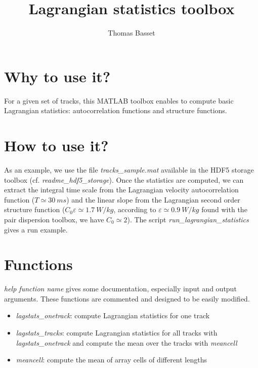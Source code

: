 \documentclass{article}
\title{Lagrangian statistics toolbox}
\author{Thomas Basset}
\begin{document}
\maketitle

\section{Why to use it?}
For a given set of tracks, this MATLAB toolbox enables to compute basic Lagrangian statistics: autocorrelation functions and structure functions. 

\section{How to use it?}
As an example, we use the file \textit{tracks\_sample.mat} available in the HDF5 storage toolbox (cf. \textit{readme\_hdf5\_storage}). Once the statistics are computed, we can extract the integral time scale from the Lagrangian velocity autocorrelation function ($T \simeq \SI{30}{ms}$) and the linear slope from the Lagrangian second order structure function ($C_0 \varepsilon \simeq \SI{1.7}{W/kg}$, according to $\varepsilon \simeq \SI{0.9}{W/kg}$ found with the pair dispersion toolbox, we have $C_0 \simeq 2$). The script \textit{run\_lagrangian\_statistics} gives a run example.

\section{Functions}
\textit{help function name} gives some documentation, especially input and output arguments. These functions are commented and designed to be easily modified.
\begin{itemize}
\item \textit{lagstats\_onetrack}: compute Lagrangian statistics for one track
\item \textit{lagstats\_tracks}: compute Lagrangian statistics for all tracks with \textit{lagstats\_onetrack} and compute the mean over the tracks with \textit{meancell}
\item \textit{meancell}: compute the mean of array cells of different lengths
\end{itemize}
\end{document}
